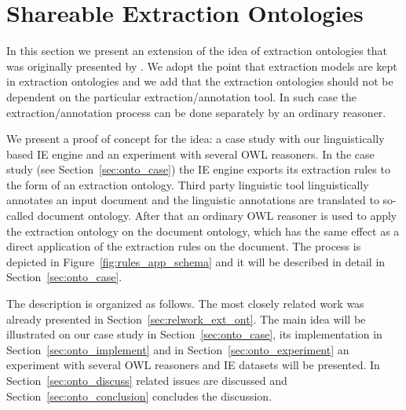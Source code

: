


\section{Shareable Extraction Ontologies} \label{sec:onto_extraction_ontologies}
\graphicspath{{../img/ch70/}}

In this section we present an extension of the idea of extraction ontologies that was originally presented by \cite{DBLP:conf/er/EmbleyTL02}. We adopt the point that extraction models are kept in extraction ontologies and we add that the extraction ontologies should not be dependent on the particular extraction/annotation tool. In such case the extraction/annotation process can be done separately by an ordinary reasoner.


We present a proof of concept for the idea: a case study with our linguistically based IE engine and an experiment with several OWL reasoners. In the case study (see Section~\ref{sec:onto_case}) the IE engine exports its extraction rules to the form of an extraction ontology. Third party linguistic tool linguistically annotates an input document and the linguistic annotations are translated to so-called document ontology. After that an ordinary OWL reasoner is used to apply the extraction ontology on the document ontology, which has the same effect as a direct application of the extraction rules on the document. The process is depicted in Figure~\ref{fig:rules_app_schema} and it will be described in detail in Section~\ref{sec:onto_case}.

\pagebreak

The description is organized as follows. The most closely related work was already presented in Section~\ref{sec:relwork_ext_ont}. The main idea will be illustrated on our case study in Section~\ref{sec:onto_case}, its implementation in Section~\ref{sec:onto_implement} and in Section~\ref{sec:onto_experiment} an experiment with several OWL reasoners and IE datasets will be presented. In Section~\ref{sec:onto_discuss} related issues are discussed and Section~\ref{sec:onto_conclusion} concludes the discussion.



